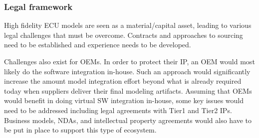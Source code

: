 \subsubsection{Legal framework}
High fidelity ECU models are seen as a material/capital asset, leading to various legal challenges that must be overcome. Contracts and approaches to sourcing need to be established and experience needs to be developed.

Challenges also exist for OEMs. In order to protect their IP, an OEM would most likely do the software integration in-house. Such an approach would significantly increase the amount model integration effort beyond what is already required today when suppliers deliver their final modeling artifacts. Assuming that OEMs would benefit in doing virtual SW integration in-house, some key issues would need to be addressed including legal agreements with Tier1 and Tier2 IPs. Business models, NDAs, and intellectual property agreements would also have to be put in place to support this type of ecosystem.


